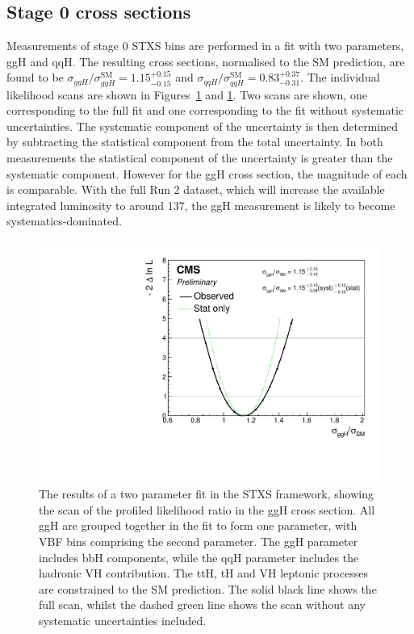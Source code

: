 \subsection{Stage 0 cross sections}
Measurements of stage 0 STXS bins are performed in a fit with two parameters, ggH and qqH.
The resulting cross sections, normalised to the SM prediction, are found to be 
$\sigma_{ggH}/\sigma_{ggH}^{\textrm{SM}} = 1.15_{-0.15}^{+0.15}$ 
and $\sigma_{qqH}/\sigma_{qqH}^{\textrm{SM}} = 0.83_{-0.31}^{+0.37}$.
The individual likelihood scans are shown 
in Figures~\ref{fig:results_Stage0_ggH} and \ref{fig:results_Stage0_ggH}.
Two scans are shown, one corresponding to the full fit
and one corresponding to the fit without systematic uncertainties.
The systematic component of the uncertainty is then determined 
by subtracting the statistical component from the total uncertainty.
In both measurements the statistical component of the uncertainty 
is greater than the systematic component.
However for the ggH cross section, the magnitude of each is comparable.
With the full Run 2 dataset, 
which will increase the available integrated luminosity to around \SI{137}{\fbinv}, 
the ggH measurement is likely to become systematics-dominated.


\begin{figure}[hptb]
\centering
\includegraphics[width=\textwidth]{Figures/Results/ObsStage0_r_ggH.pdf}
\caption{
  The results of a two parameter fit in the STXS framework,
  showing the scan of the profiled likelihood ratio in the ggH cross section.
  All ggH are grouped together in the fit to form one parameter, 
  with VBF bins comprising the second parameter.
  The ggH parameter includes bbH components, 
  while the qqH parameter includes the hadronic VH contribution. 
  The ttH, tH and VH leptonic processes are constrained to the SM prediction. 
  The solid black line shows the full scan, 
  whilst the dashed green line shows the scan without any systematic uncertainties included.
}
\label{fig:results_Stage0_ggH}
\end{figure}

